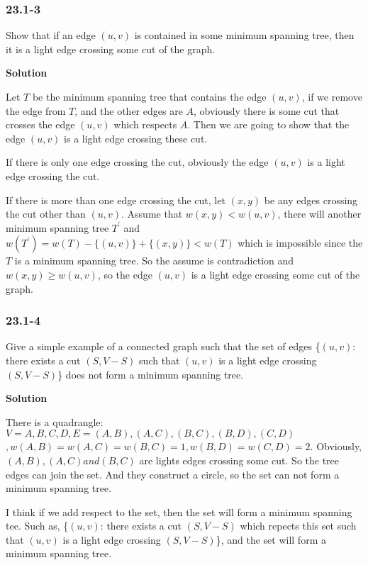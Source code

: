 \subsubsection {23.1-3}

Show that if an edge $(u, v)$ is contained in some minimum spanning tree, then
it is a light edge crossing some cut of the graph.

\textbf{Solution}

Let $T$ be the minimum spanning tree that contains the edge $(u, v)$, if we
remove the edge from $T$, and the other edges are $A$, obviously there is some
cut that crosses the edge $(u, v)$ which respects $A$. Then we are going to show
that the edge $(u, v)$ is a light edge crossing these cut.

If there is only one edge crossing the cut, obviously the edge $(u, v)$ is a
light edge crossing the cut.

If there is more than one edge crossing the cut, let $(x, y)$ be any edges
crossing the cut other than $(u, v)$. Assume that $w(x, y) < w(u, v)$, there
will another minimum spanning tree $T^{'}$ and
$w(T^{'}) = w(T) - \{(u, v)\} + \{(x, y)\} < w(T)$ which is impossible since the
$T$ is a minimum spanning tree. So the assume is contradiction and
$w(x, y) \geq w(u, v)$, so the edge $(u, v)$ is a light edge crossing some cut
of the graph.

\subsubsection {23.1-4}

Give a simple example of a connected graph such that the set of edges
\{$(u, v)$: there exists a cut $(S, V - S)$ such that $(u, v)$ is a light edge
crossing $(S, V - S)$\} does not form a minimum spanning tree.

\textbf{Solution}

There is a quadrangle: $V={A,B,C,D}, E={(A,B), (A,C), (B,C), (B,D), (C,D)}$
$, w(A,B)=w(A,C)=w(B,C)=1, w(B,D)=w(C,D)=2$. Obviously, $(A,B), (A,C) and (B,C)$
are lights edges crossing some cut. So the tree edges can join the set. And they
construct a circle, so the set can not form a minimum spanning tree.

I think if we add {\color{red} respect} to the set, then the set will form a
minimum spanning tee. Such as, \{$(u, v)$: there exists a cut $(S, V - S)$
{\color{red} which repects this set} such that $(u, v)$ is a light edge
crossing $(S, V - S)$\}, and the set will form a minimum spanning tree.

